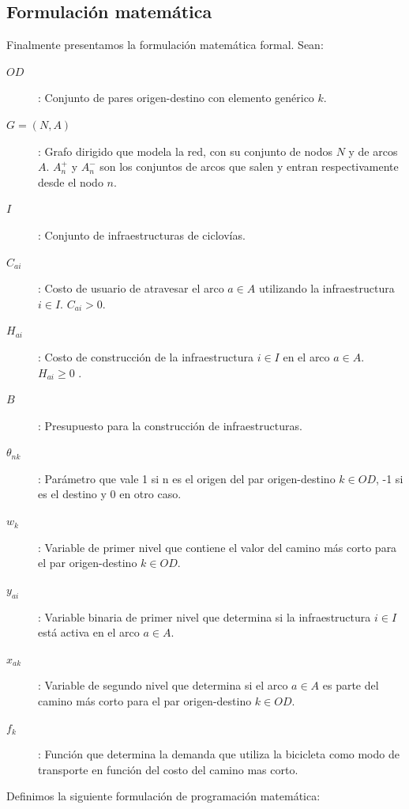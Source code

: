 \documentclass{article}
\begin{document}
  \subsection{Formulación matemática}

  Finalmente presentamos la formulación matemática formal. Sean:

  \begin{description}
    \item[$OD$]: Conjunto de pares origen-destino con elemento genérico $k$.
    \item[$G=(N,A)$]: Grafo dirigido que modela la red, con su conjunto de nodos $N$ y de arcos $A$. $A_n^+$ y $A_n^-$ son los conjuntos de arcos que salen y entran respectivamente desde el nodo $n$.
    \item[$I$]: Conjunto de infraestructuras de ciclovías.
    \item[$C_{ai}$]: Costo de usuario de atravesar el arco $a \in A$ utilizando la infraestructura $i \in I$. $C_{ai} > 0$.
    \item[$H_{ai}$]: Costo de construcción de la infraestructura $i \in I$ en el arco $a \in A$. $H_{ai} \geq 0$ .
    \item[$B$]: Presupuesto para la construcción de infraestructuras.
    \item[$\theta_{nk}$]: Parámetro que vale 1 si n es el origen del par origen-destino $k \in OD$, -1 si es el destino y 0 en otro caso.
    \item[$w_k$]: Variable de primer nivel que contiene el valor del camino más corto para el par origen-destino $k \in OD$.
    \item[$y_{ai}$]: Variable binaria de primer nivel que determina si la infraestructura $i \in I$ está activa en el arco $a \in A$.
    \item[$x_{ak}$]: Variable de segundo nivel que determina si el arco $a \in A$ es parte del camino más corto para el par origen-destino $k \in OD$.
    \item[$f_k$]: Función que determina la demanda que utiliza la bicicleta como modo de transporte en función del costo del camino mas corto.
  \end{description}

  Definimos la siguiente formulación de programación matemática:
\end{document}
